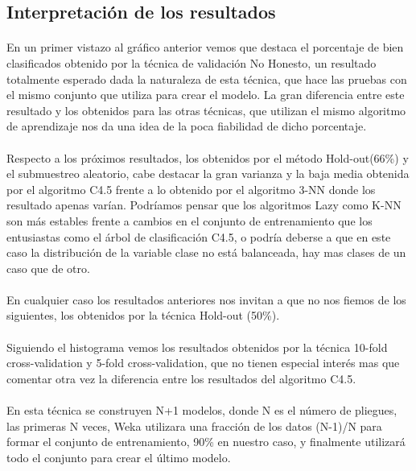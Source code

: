 \documentclass[es]{ifirak}
\begin{document}
\subsection{Interpretación de los resultados}
\paragraph{}
En un primer vistazo al gráfico anterior vemos que destaca el porcentaje de bien clasificados obtenido por la técnica de validación No Honesto, un resultado totalmente esperado dada la naturaleza de esta técnica, que hace las pruebas con el mismo conjunto que utiliza para crear el modelo. La gran diferencia entre este resultado y los obtenidos para las otras técnicas, que utilizan el mismo algoritmo de aprendizaje nos da una idea de la poca fiabilidad de dicho porcentaje.
\paragraph{}
Respecto a los próximos resultados, los obtenidos por el método Hold-out(66\%) y el submuestreo aleatorio, cabe destacar la gran varianza y la baja media obtenida por el algoritmo C4.5 frente a lo obtenido por el algoritmo 3-NN donde los resultado apenas varían. Podríamos pensar que los algoritmos Lazy como K-NN son más estables frente a cambios en el conjunto de entrenamiento que los entusiastas como el árbol de clasificación C4.5, o podría deberse a que en este caso la distribución de la variable clase no está balanceada, hay mas clases de un caso que de otro. 
\paragraph{}
En cualquier caso los resultados anteriores nos invitan a que no nos fiemos de los siguientes, los obtenidos por la técnica Hold-out (50\%).
\paragraph{}
Siguiendo el histograma vemos los resultados obtenidos por la técnica 10-fold cross-validation y 5-fold cross-validation, que no tienen especial interés mas que comentar otra vez la diferencia entre los resultados del algoritmo C4.5.
\paragraph{}
En esta técnica se construyen N+1 modelos, donde N es el número de pliegues, las primeras N veces, Weka utilizara una fracción de los datos (N-1)/N para formar el conjunto de entrenamiento, 90\% en nuestro caso, y finalmente utilizará todo el conjunto para crear el último modelo.
\end{document}
